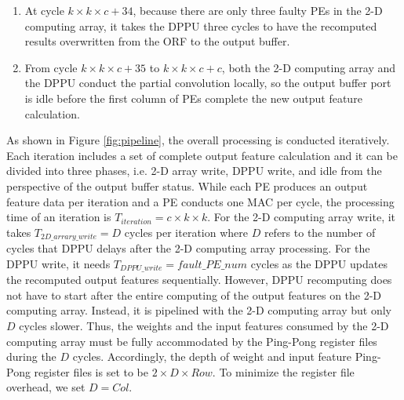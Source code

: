 \begin{enumerate}
    \item At cycle $ k\times k\times c + 34$, because there are only three faulty PEs in the 2-D computing array, it takes the DPPU three cycles to have the recomputed results overwritten from the ORF to the output buffer.

    \item From cycle $ k\times k\times c + 35$ to $ k\times k\times c + c$, both the 2-D computing array and the DPPU conduct the partial convolution locally, so the output buffer port is idle before the first column of PEs complete the new output feature calculation. 

\end{enumerate}

As shown in Figure \ref{fig:pipeline}, the overall processing is conducted iteratively. Each iteration includes a set of complete output feature calculation and it can be divided into three phases, i.e. 2-D array write, DPPU write, and idle from the perspective of the output buffer status. While each PE produces an output feature data per iteration and a PE conducts one MAC per cycle, the processing time of an iteration is $T_{iteration}=c \times k \times k$. For the 2-D computing array write, it takes $T_{2D\_arrary\_write} = D$ cycles per iteration where $D$ refers to the number of cycles that DPPU delays after the 2-D computing array processing. For the DPPU write, it needs $T_{DPPU\_write}=fault\_PE\_num$ cycles as the DPPU updates the recomputed output features sequentially. However, DPPU recomputing does not have to start after the entire computing of the output features on the 2-D computing array. Instead, it is pipelined with the 2-D computing array but only $D$ cycles slower. Thus, the weights and the input features consumed by the 2-D computing array must be fully accommodated by the Ping-Pong register files during the $D$ cycles. Accordingly, the depth of weight and input feature Ping-Pong register files is set to be $2\times D \times Row$. To minimize the register file overhead, we set $D=Col$.


